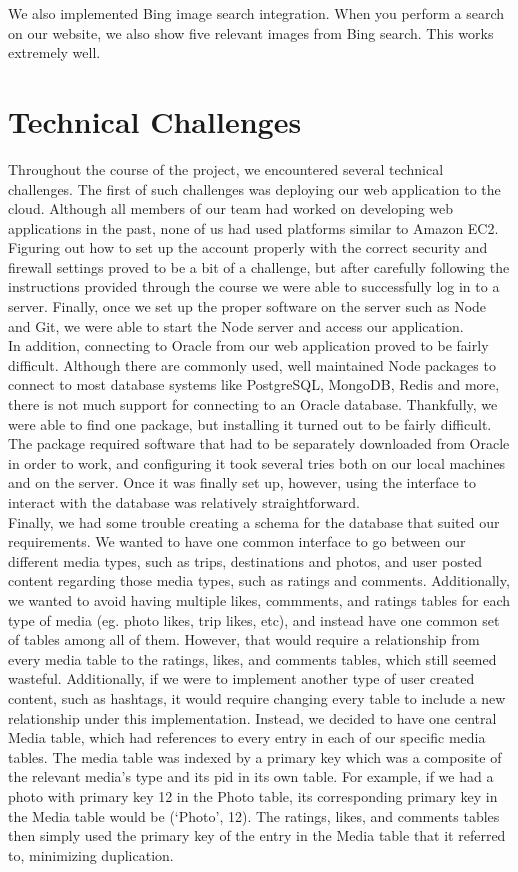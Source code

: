 \documentclass[11pt]{amsart}
\begin{document}
We also implemented Bing image search integration. When you perform a search on our website,
we also show five relevant images from Bing search. This works extremely well.

\section{Technical Challenges}
Throughout the course of the project, we encountered several technical challenges. The first of such 
challenges was deploying our web application to the cloud. Although all members of our team had 
worked on developing web applications in the past, none of us had used platforms similar to Amazon EC2.
Figuring out how to set up the account properly with the correct security and firewall settings proved
to be a bit of a challenge, but after carefully following the instructions provided through the course
we were able to successfully log in to a server. Finally, once we set up the proper software on the server
such as Node and Git, we were able to start the Node server and access our application.\\

In addition, connecting to Oracle from our web application proved to be fairly difficult. Although there are
commonly used, well maintained Node packages to connect to most database systems like PostgreSQL, MongoDB,
Redis and more, there is not much support for connecting to an Oracle database. Thankfully, we were able to find
one package, but installing it turned out to be fairly difficult. The package required software that had to be
separately downloaded from Oracle in order to work, and configuring it took several tries both on our local machines
and on the server. Once it was finally set up, however, using the interface to interact with the database was
relatively straightforward.\\

Finally, we had some trouble creating a schema for the database that suited our requirements. We wanted to have
one common interface to go between our different media types, such as trips, destinations and photos, and user posted
content regarding those media types, such as ratings and comments. Additionally, we wanted to avoid having multiple 
likes, commments, and ratings tables for each type of media (eg. photo likes, trip likes, etc), and instead
have one common set of tables among all of them. However, that would require a relationship from every media
table to the ratings, likes, and comments tables, which still seemed wasteful. Additionally, if we were to implement
another type of user created content, such as hashtags, it would require changing every table to include a
new relationship under this implementation. Instead, we decided to have one central Media table, which had references to
every entry in each of our specific media tables. The media table was indexed by a primary key which was a composite
of the relevant media's type and its pid in its own table. For example, if we had a photo with primary key 12 in the Photo table, its corresponding primary key in the Media table would be (`Photo', 12). The ratings, likes, and comments tables then simply used the primary key of the entry in the Media table that it referred to, minimizing duplication.
\end{document}
